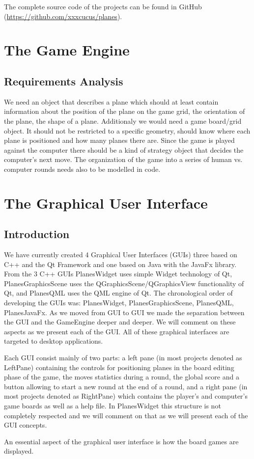 \documentclass{report}
\begin{document}
The complete source code of the projects can be found in GitHub (\url{https://github.com/xxxcucus/planes}).

\chapter {The Game Engine }
\section{Requirements Analysis}
We need an object that describes a plane which should at least contain information about the position of the plane on the game grid, the orientation of the plane, the shape of a plane. Additionaly we would need a game board/grid object. It should not be restricted to a specific geometry, should know where each plane is positioned and how many planes there are. Since the game is played against the computer there should be a kind of strategy object that decides the computer's next move. The organization of the game into a series of human vs. computer rounds needs also to be modelled in code.







\chapter {The Graphical User Interface}

\section{Introduction}

We have currently created 4 Graphical User Interfaces (GUIs) three based on C++ and the Qt Framework and one based on Java with the JavaFx library. From the 3 C++ GUIs PlanesWidget uses simple Widget technology of Qt, PlanesGraphicsScene uses the QGraphicsScene/QGraphicsView functionality of Qt, and PlanesQML uses the QML engine of Qt. The chronological order of developing the GUIs was: PlanesWidget, PlanesGraphicsScene, PlanesQML, PlanesJavaFx. As we moved from GUI to GUI we made the separation between the GUI and the GameEngine deeper and deeper. We will comment on these aspects as we present each of the GUI. All of these graphical interfaces are targeted to desktop applications.

Each GUI consist mainly of two parts: a left pane (in most projects denoted as LeftPane) containing the controls for positioning planes in the board editing phase of the game, the moves statistics during a round, the global score and a button allowing to start a new round at the end of a round, and a right pane (in most projects denoted as RightPane) which contains the player's and computer's game boards as well as a help file. In PlanesWidget this structure is not completely respected and we will comment on that as we will present each of the GUI concepts.

An essential aspect of the graphical user interface is how the board games are displayed. 





\end{document}
